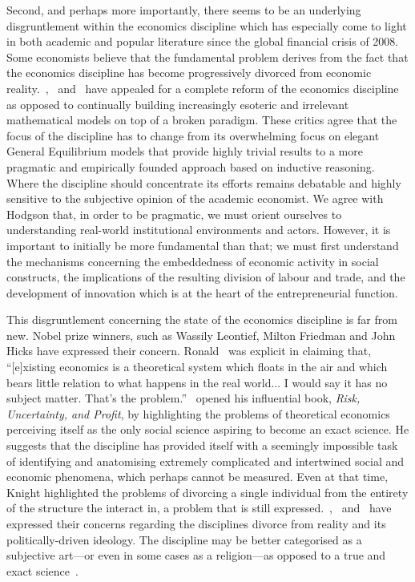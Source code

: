 Second, and perhaps more importantly, there seems to be an underlying disgruntlement within the economics discipline which has especially come to light in both academic and popular literature since the global financial crisis of 2008. Some economists believe that the fundamental problem derives from the fact that the economics discipline has become progressively divorced from economic reality.~\citet{Hodgson2009},~\citet{Smith2010} and~\citet{Keen2011} have appealed for a complete reform of the economics discipline as opposed to continually building increasingly esoteric and irrelevant mathematical models on top of a broken paradigm. These critics agree that the focus of the discipline has to change from its overwhelming focus on elegant General Equilibrium models that provide highly trivial results to a more pragmatic and empirically founded approach based on inductive reasoning. Where the discipline should concentrate its efforts remains debatable and highly sensitive to the subjective opinion of the academic economist. We agree with Hodgson that, in order to be pragmatic, we must orient ourselves to understanding real-world institutional environments and actors. However, it is important to initially be more fundamental than that; we must first understand the mechanisms concerning the embeddedness of economic activity in social constructs, the implications of the resulting division of labour and trade, and the development of innovation which is at the heart of the entrepreneurial function.

This disgruntlement concerning the state of the economics discipline is far from new. Nobel prize winners, such as Wassily Leontief, Milton Friedman and John Hicks have expressed their concern. Ronald~\citet{Coase1997} was explicit in claiming that, ``[e]xisting economics is a theoretical system which floats in the air and which bears little relation to what happens in the real world... I would say it has no subject matter. That's the problem.''~\citet{Knight1921} opened his influential book, \textit{Risk, Uncertainty, and Profit}, by highlighting the problems of theoretical economics perceiving itself as the only social science aspiring to become an exact science. He suggests that the discipline has provided itself with a seemingly impossible task of identifying and anatomising extremely complicated and intertwined social and economic phenomena, which perhaps cannot be measured. Even at that time, Knight highlighted the problems of divorcing a single individual from the entirety of the structure the interact in, a problem that is still expressed.~\citet{Krugman2009},~\citet{Stiglitz2010} and~\citet{Varoufakis2011} have expressed their concerns regarding the disciplines divorce from reality and its politically-driven ideology. The discipline may be better categorised as a subjective art---or even in some cases as a religion---as opposed to a true and exact science~\citep{Backhouse2010}.

